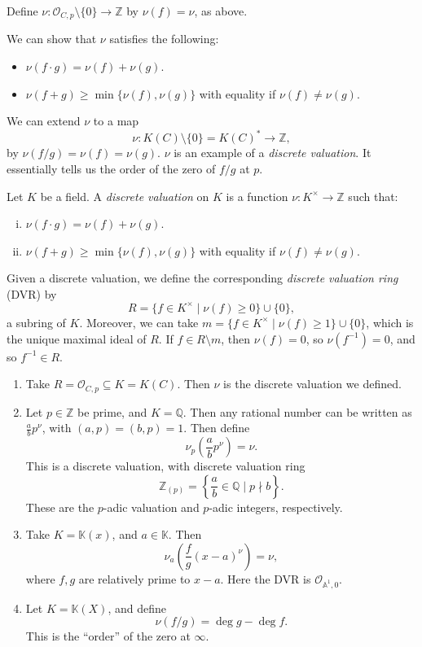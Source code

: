 \documentclass[12pt]{article}
\begin{document}
\begin{definition}
	Define $\nu : \mathcal{O}_{C, p} \setminus \{0\} \to \mathbb{Z}$ by $\nu(f) = \nu$, as above.
\end{definition}

We can show that $\nu$ satisfies the following:
\begin{itemize}
	\item $\nu(f \cdot g) = \nu(f) + \nu(g)$.
	\item $\nu(f + g) \geq \min\{\nu(f), \nu(g)\}$ with equality if  $\nu(f) \neq \nu(g)$.
\end{itemize}
We can extend $\nu$ to a map
\[
	\nu : K(C) \setminus \{0\} = K(C)^\ast \to \mathbb{Z},
\]
by $\nu(f/g) = \nu(f) = \nu(g)$. $\nu$ is an example of a \emph{discrete valuation}. It essentially tells us the order of the zero of $f/g$ at $p$.

\begin{definition}
	Let $K$ be a field. A \emph{discrete valuation} on $K$ is a function $\nu : K^\times \to \mathbb{Z}$ such that:
	\begin{enumerate}[(i)]
		\item $\nu(f \cdot g) =\nu(f) + \nu(g)$.
		\item $\nu(f + g) \geq \min\{\nu(f), \nu(g)\}$ with equality if $\nu(f) \neq \nu(g)$.
	\end{enumerate}
	Given a discrete valuation, we define the corresponding \emph{discrete valuation ring} (DVR) by
	\[
		R = \{f \in K^\times \mid \nu(f) \geq 0\} \cup \{0\},
	\]
	a subring of $K$. Moreover, we can take $m = \{f \in K^\times \mid \nu(f) \geq 1\} \cup \{0\}$, which is the unique maximal ideal of $R$. If $f \in R \setminus m$, then $\nu(f) = 0$, so $\nu(f^{-1}) = 0$, and so $f^{-1} \in R$.
\end{definition}

\begin{exbox}
	\begin{enumerate}
		\item Take $R = \mathcal{O}_{C, p} \subseteq K = K(C)$. Then $\nu$ is the discrete valuation we defined.
		\item Let $p \in \mathbb{Z}$ be prime, and $K = \mathbb{Q}$. Then any rational number can be written as $\frac{a}{b} p^\nu$, with $(a, p) = (b, p) = 1$. Then define
			\[
			\nu_p \left( \frac{a}{b} p^\nu\right) = \nu.
			\]
			This is a discrete valuation, with discrete valuation ring
			\[
				\mathbb{Z}_{(p)} = \left\{ \frac{a}{b} \in \mathbb{Q} \mid p \nmid b \right\}.
			\]
			These are the $p$-adic valuation and $p$-adic integers, respectively.
		\item Take $K = \mathbb{K}(x)$, and $a \in \mathbb{K}$. Then
			\[
			\nu_a \left( \frac{f}{g} (x - a)^\nu \right) = \nu,
			\]
			where $f, g$ are relatively prime to $x-a$. Here the DVR is $\mathcal{O}_{\mathbb{A}^1, 0}$.
		\item Let $K = \mathbb{K}(X)$, and define
			\[
			\nu(f/g) = \deg g - \deg f.
			\]
			This is the ``order'' of the zero at $\infty$.
	\end{enumerate}
\end{exbox}
\end{document}
